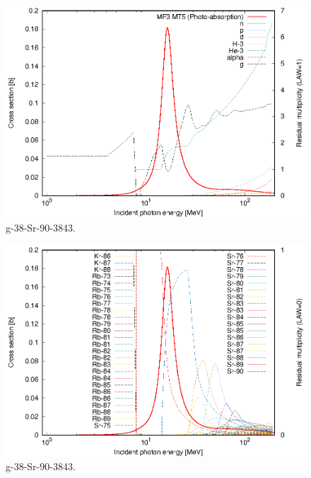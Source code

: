 \begin{figure}
 \includegraphics[width=\linewidth]{eps/g_38-Sr-90_3843.eps}
  \caption{g-38-Sr-90-3843.}
\end{figure}
\begin{figure}
 \includegraphics[width=\linewidth]{eps-law0/g_38-Sr-90_3843.eps}
 \caption{g-38-Sr-90-3843.}
\end{figure}
\newpage \clearpage


